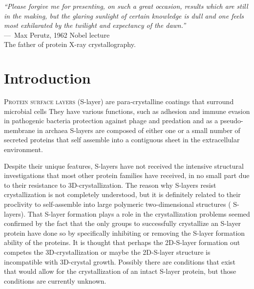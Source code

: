 \acresetall
{}
\begin{epigraph}
  \emph{``Please forgive me for presenting, on such a great occasion, results which are still in the making, but the glaring sunlight of certain knowledge is dull and one feels most exhilarated by the twilight and expectancy of the dawn.''} \\---~Max Perutz, 1962 Nobel lecture\\ The father of protein X-ray crystallography.
\end{epigraph}

\section{Introduction} %
\label{sec:crystal_introduction} 

\lettrine[lines=2]{P}{rotein surface layers} (\acs{S-layer}) are para-crystalline coatings that
surround microbial cells
 They have various functions, such as adhesion
and immune evasion in pathogenic bacteria
 protection against phage and predation
 and as a pseudo-membrane in archaea
 \acp{S-layer} are composed of either one or a small number of secreted proteins that self assemble
into a contiguous sheet in the extracellular environment. 

Despite their unique features, \acp{S-layer} have not received the intensive structural
investigations that most other protein families have received, in no
small part due to their resistance to 3D-crystallization. The reason why \acp{S-layer} resist
crystallization is not completely understood, but it is definitely related to their proclivity
to self-assemble into large polymeric two-dimensional structures (\ie
\acp{S-layer}). That \ac{S-layer} formation plays a role in the crystallization
problems seemed confirmed by the fact that the
 only groups to successfully crystallize an \ac{S-layer} protein
 have done so by specifically inhibiting or removing the \ac{S-layer} formation ability of
 the proteins. It is thought that perhaps
 the 2D-\ac{S-layer} formation out competes the 3D-crystallization or maybe the
 2D-\ac{S-layer} structure is incompatible with 3D-crystal growth. Possibly
 there are conditions that exist that would allow for the crystallization of an
 intact \ac{S-layer} protein, but those conditions are currently unknown.

